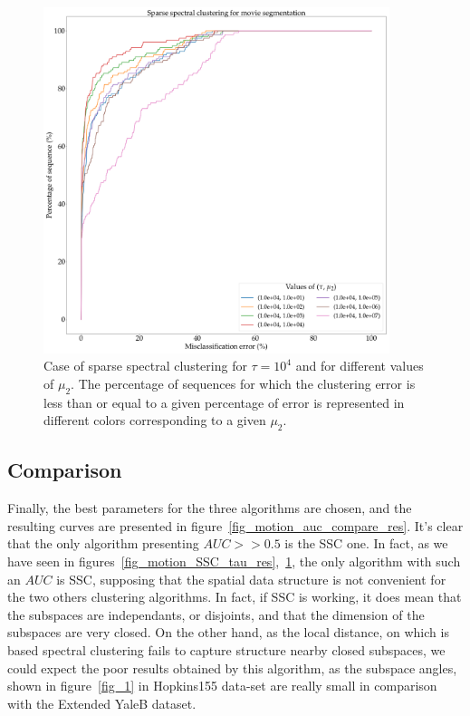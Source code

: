 \documentclass[12pt,a4paper,onecolumn]{article}
\begin{document}
\begin{figure}[H]
	\centering
	\includegraphics[width = 0.9\textwidth]{SSC_mu2}
	\caption{Case of sparse spectral clustering for \(\tau = 10^4\) and for different values of \(\mu_2\). The percentage of sequences for which the clustering error is less than or equal to a given percentage of error is represented in different colors corresponding to a given \(\mu_2\).}
	\label{fig_motion_SSC_mu2_res}
\end{figure}


\subsection{Comparison}

Finally, the best parameters for the three algorithms are chosen, and the resulting curves are presented in figure~\ref{fig_motion_auc_compare_res}. It's clear that the only algorithm presenting \(AUC >> 0.5\) is the SSC one. In fact, as we have seen in figures~\ref{fig_motion_SSC_tau_res},~\ref{fig_motion_SSC_mu2_res}, the only algorithm with such an \(AUC\) is SSC, supposing that the spatial data structure is not convenient for the two others clustering algorithms. In fact, if SSC is working, it does mean that the subspaces are independants, or disjoints, and that the dimension of the subspaces are very closed. On the other hand, as the local distance, on which is based spectral clustering fails to capture structure nearby closed subspaces, we could expect the poor results obtained by this algorithm, as the subspace angles, shown in figure~\ref{fig_1} in Hopkins155 data-set are really small in comparison with the Extended YaleB dataset.
\end{document}
